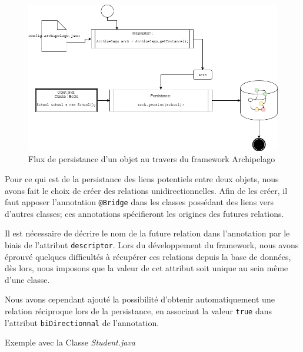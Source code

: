 \documentclass[a4paper,fleqn,12pt,oneside]{report}
\begin{document}
\begin{figure}[!h]
\centering
\includegraphics[scale=0.5]{figures/Persist.png}
\caption{Flux de persistance d'un objet au travers du framework Archipelago}
\label{fig:Persist}
\end{figure}
    
\newpage
Pour ce qui est de la persistance des liens potentiels entre deux objets, nous avons fait le choix de créer des relations unidirectionnelles. Afin de les créer, il faut apposer l'annotation \texttt{@Bridge} dans les classes possédant des liens vers d'autres classes; ces annotations spécifieront les origines des futures relations.

Il est nécessaire de décrire le nom de la future relation dans l'annotation par le biais de l'attribut \texttt{descriptor}. Lors du développement du framework, nous avons éprouvé quelques difficultés à récupérer ces relations depuis la base de données, dès lors, nous imposons que la valeur de cet attribut soit unique au sein même d'une classe. 

Nous avons cependant ajouté la possibilité d'obtenir automatiquement une relation réciproque lors de la persistance, en associant la valeur \texttt{true} dans l'attribut \texttt{biDirectionnal} de l'annotation. 

Exemple avec la Classe \textit{Student.java}
\end{document}
